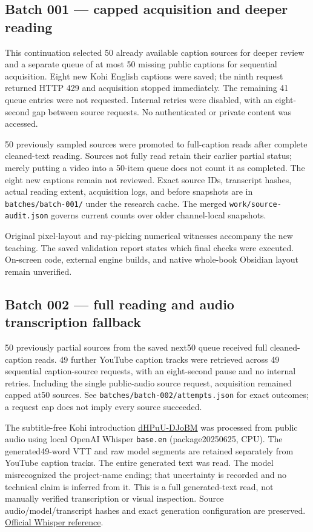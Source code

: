 \subsection{Batch 001 --- capped acquisition and deeper reading}\label{appendix-877738f6f4d2-batch-001-capped-acquisition-and-deeper-reading}

This continuation selected 50 already available caption sources for deeper review and a separate queue of at most 50 missing public captions for sequential acquisition. Eight new Kohi English captions were saved; the ninth request returned HTTP 429 and acquisition stopped immediately. The remaining 41 queue entries were not requested. Internal retries were disabled, with an eight-second gap between source requests. No authenticated or private content was accessed.

50 previously sampled sources were promoted to full-caption reads after complete cleaned-text reading. Sources not fully read retain their earlier partial status; merely putting a video into a 50-item queue does not count it as completed. The eight new captions remain not reviewed. Exact source IDs, transcript hashes, actual reading extent, acquisition logs, and before snapshots are in \texttt{batches/batch-001/} under the research cache. The merged \texttt{work/source-audit.json} governs current counts over older channel-local snapshots.

Original pixel-layout and ray-picking numerical witnesses accompany the new teaching. The saved validation report states which final checks were executed. On-screen code, external engine builds, and native whole-book Obsidian layout remain unverified.

\subsection{Batch 002 --- full reading and audio transcription fallback}\label{appendix-877738f6f4d2-batch-002-full-reading-and-audio-transcription-fallback}

50 previously partial sources from the saved next50 queue received full cleaned-caption reads. 49 further YouTube caption tracks were retrieved across 49 sequential caption-source requests, with an eight-second pause and no internal retries. Including the single public-audio source request, acquisition remained capped at50 sources. See \texttt{batches/batch-002/attempts.json} for exact outcomes; a request cap does not imply every source succeeded.

The subtitle-free Kohi introduction \href{https://www.youtube.com/watch?v=dHPuU-DJoBM}{dHPuU-DJoBM} was processed from public audio using local OpenAI Whisper \texttt{base.en} (package20250625, CPU). The generated49-word VTT and raw model segments are retained separately from YouTube caption tracks. The entire generated text was read. The model misrecognized the project-name ending; that uncertainty is recorded and no technical claim is inferred from it. This is a full generated-text read, not manually verified transcription or visual inspection. Source audio/model/transcript hashes and exact generation configuration are preserved. \href{https://github.com/openai/whisper}{Official Whisper reference}.


